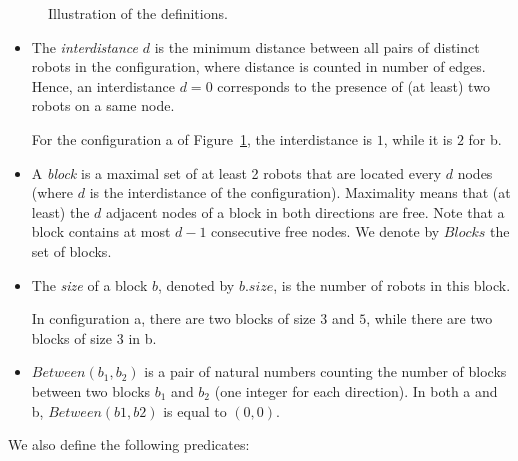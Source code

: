 \begin{figure}[htbp]
\begin{center}
{ 
\label{fig:def2} 
}
\caption{Illustration of the definitions.} 
\label{fig:floDef} 
\end{center} 
\end{figure} 

\begin{itemize}%
\item The \emph{interdistance} $d$ is the minimum distance between all
  pairs of distinct robots in the configuration, where distance is
  counted in number of edges. Hence, an interdistance $d=0$
  corresponds to the presence of (at least) two robots on a same node.

  For the configuration a of Figure~\ref{fig:floDef}, the interdistance
  is $1$, while it is $2$ for b.  

\item A \emph{block} is a maximal set of at least 2 robots that are
  located every $d$ nodes (where $d$ is the interdistance of the
  configuration). Maximality means that (at least) the $d$ adjacent
  nodes of a block in both directions are free.  Note that a block
  contains at most $d-1$ consecutive free nodes.
  We denote by $\textit{Blocks}$ the set of blocks.
\item The \emph{size} of a block $b$, denoted by $b.\textit{size}$, is
  the number of robots in this block.

  In configuration a, there are two blocks of size $3$ and $5$, 
  while there are two blocks of size $3$ in b.

\item $\textit{Between}(b_1, b_2)$ is a pair of natural numbers
  counting the number of blocks between two blocks $b_1$ and $b_2$
  (one integer for each direction).  In both a and b, 
  $\textit{Between}(b1, b2)$ is equal to $(0, 0)$.
   
\end{itemize}
We also define the following predicates: 
